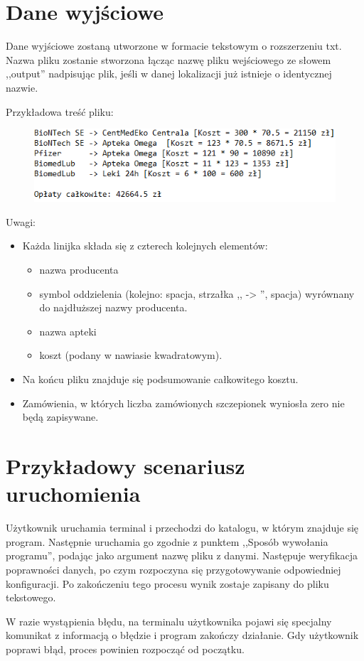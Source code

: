 \documentclass{article}
\begin{document}
\newpage
\section{Dane wyjściowe}
{\fontsize{12}{12}\selectfont
    Dane wyjściowe zostaną utworzone w formacie tekstowym o rozszerzeniu txt. Nazwa pliku zostanie stworzona łącząc nazwę pliku wejściowego ze słowem ,,output'' nadpisując plik, jeśli w danej lokalizacji już istnieje o identycznej nazwie.
    
    Przykładowa treść pliku:

    \begin{figure} [hbt!]
        \centering
        \includegraphics[width=12cm]{output.png}
    \end{figure}
    

    Uwagi:
    \begin{itemize}
        \item Każda linijka składa się z czterech kolejnych elementów:
            \begin{itemize}
                \item nazwa producenta
                \item symbol oddzielenia (kolejno: spacja, strzałka ,, -> '', spacja) wyrównany do najdłuższej nazwy producenta.
                \item nazwa apteki
                \item koszt (podany w nawiasie kwadratowym).
            \end{itemize}
        \item Na końcu pliku znajduje się podsumowanie całkowitego kosztu.
        \item Zamówienia, w których liczba zamówionych szczepionek wyniosła zero nie będą zapisywane.
    
    \end{itemize}
}
\section{Przykładowy scenariusz uruchomienia}

{\fontsize{12}{12}\selectfont
    
    Użytkownik uruchamia terminal i przechodzi do katalogu, w którym znajduje się program. Następnie uruchamia go zgodnie z punktem ,,Sposób wywołania programu'', podając jako argument nazwę pliku z danymi. Następuje weryfikacja poprawności danych, po czym rozpoczyna się przygotowywanie odpowiedniej konfiguracji. Po zakończeniu tego procesu wynik zostaje zapisany do pliku tekstowego.
    
    W razie wystąpienia błędu, na terminalu użytkownika pojawi się specjalny komunikat z informacją o błędzie i program zakończy działanie. Gdy użytkownik poprawi błąd, proces powinien rozpocząć od początku.


}
\end{document}
